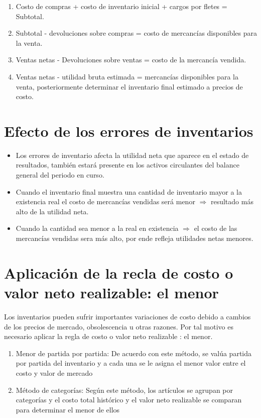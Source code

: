 \documentclass{article}
\begin{document}
\begin{enumerate}
    \begin{enumerate}
        \item Costo de compras + costo de inventario inicial + cargos por fletes = Subtotal.
        \item Subtotal - devoluciones sobre compras = costo de mercancías disponibles para la venta.
        \item Ventas netas - Devoluciones sobre ventas = costo de la mercancía vendida.
        \item Ventas netas - utilidad bruta estimada = mercancías disponibles para la venta, posteriormente determinar el inventario final estimado a precios de costo. 
    \end{enumerate}
\end{enumerate}

\section{Efecto de los errores de inventarios}
\begin{itemize}
    \item Los errores de inventario afecta la utilidad neta que aparece en el estado de resultados, también estará presente en los activos circulantes del balance general del periodo en curso.
    \item Cuando el inventario final muestra una cantidad de inventario mayor a la existencia real el costo de mercancías vendidas será menor $\Rightarrow$ resultado más alto de la utilidad neta.
    \item Cuando la cantidad sea menor a la real en existencia $\Rightarrow$ el costo de las mercancías vendidas sera más alto, por ende refleja utilidades netas menores.
\end{itemize}

\section{Aplicación de la recla de costo o valor neto realizable: el menor}
Los inventarios  pueden sufrir importantes variaciones de costo debido a cambios de los precios de mercado, obsolescencia u otras razones. Por tal motivo es necesario aplicar la regla de costo  o valor neto realizable : el menor.
\begin{enumerate}
    \item Menor de partida por partida: De acuerdo con este método, se valúa partida por partida del inventario y a cada una se le asigna el menor valor entre el costo y valor de mercado
    \item Método de categorías: Según este método, los artículos se agrupan por categorías y el costo total histórico y el valor neto realizable se comparan para determinar el menor de ellos
\end{enumerate}
\end{document}
